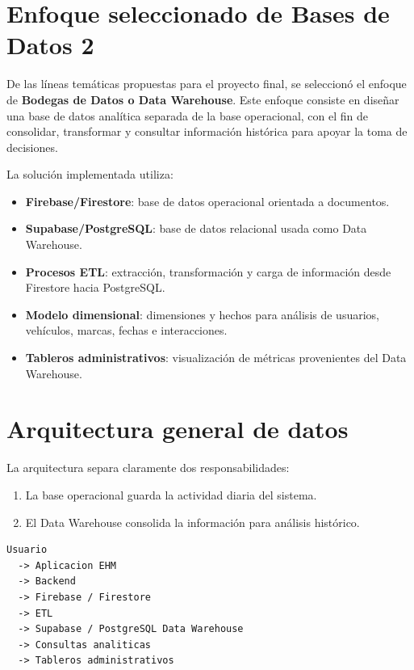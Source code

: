 \documentclass[12pt,letterpaper]{article}
\begin{document}
\section{Enfoque seleccionado de Bases de Datos 2}

De las líneas temáticas propuestas para el proyecto final, se seleccionó el enfoque de \textbf{Bodegas de Datos o Data Warehouse}. Este enfoque consiste en diseñar una base de datos analítica separada de la base operacional, con el fin de consolidar, transformar y consultar información histórica para apoyar la toma de decisiones.

La solución implementada utiliza:

\begin{itemize}
    \item \textbf{Firebase/Firestore}: base de datos operacional orientada a documentos.
    \item \textbf{Supabase/PostgreSQL}: base de datos relacional usada como Data Warehouse.
    \item \textbf{Procesos ETL}: extracción, transformación y carga de información desde Firestore hacia PostgreSQL.
    \item \textbf{Modelo dimensional}: dimensiones y hechos para análisis de usuarios, vehículos, marcas, fechas e interacciones.
    \item \textbf{Tableros administrativos}: visualización de métricas provenientes del Data Warehouse.
\end{itemize}

\section{Arquitectura general de datos}

La arquitectura separa claramente dos responsabilidades:

\begin{enumerate}
    \item La base operacional guarda la actividad diaria del sistema.
    \item El Data Warehouse consolida la información para análisis histórico.
\end{enumerate}

\begin{lstlisting}[style=textstyle,caption={Flujo general de datos}]
Usuario
  -> Aplicacion EHM
  -> Backend
  -> Firebase / Firestore
  -> ETL
  -> Supabase / PostgreSQL Data Warehouse
  -> Consultas analiticas
  -> Tableros administrativos
\end{lstlisting}
\end{document}
